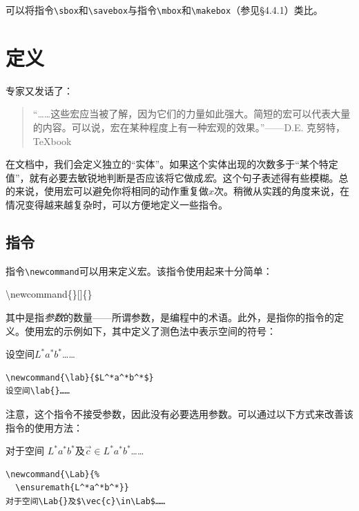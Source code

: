 可以将指令\verb|\sbox|和\verb|\savebox|与指令\verb|\mbox|和\verb|\makebox|（参见\S 4.4.1）类比。

\section{定义}

专家又发话了：

\begin{quote}
  “……这些宏应当被了解，因为它们的力量如此强大。简短的宏可以代表大量的内容。可以说，宏在某种程度上有一种宏观的效果。”——D.E. 克努特，\TeX book
\end{quote}

在文档中，我们会定义独立的“实体”。如果这个实体出现的次数多于“某个特定值”，就有必要去敏锐地判断是否应该将它做成\emph{宏}。这个句子表述得有些模糊。总的来说，使用宏可以避免你将相同的动作重复做$x$次。稍微从实践的角度来说，在情况变得越来越复杂时，可以方便地定义一些指令。

\subsection{指令}

指令\verb|\newcommand|可以用来定义宏。该指令使用起来十分简单：

\begin{dmd}
\backslash newcommand\{\}[]\{\}
\end{dmd}

其中是指\emph{参数}的数量——所谓参数，是编程中的术语。此外，是指你的指令的定义。使用宏的示例如下，其中定义了测色法中表示空间的符号：

\begin{codelist}[4.18]{
  \newcommand{\lab}{$L^*a^*b^*$}
设空间\lab{}……
}\begin{verbatim}
\newcommand{\lab}{$L^*a^*b^*$}
设空间\lab{}……
\end{verbatim}
\end{codelist}

注意，这个指令不接受参数，因此没有必要选用参数。可以通过以下方式来改善该指令的使用方法：

\begin{codelist}[4.19]{
\newcommand{\Lab}{
  \ensuremath{L^*a^*b^*}}
对于空间\Lab{}及$\vec{c}\in\Lab$……
}\begin{verbatim}
\newcommand{\Lab}{%
  \ensuremath{L^*a^*b^*}}
对于空间\Lab{}及$\vec{c}\in\Lab$……
\end{verbatim}
\end{codelist}

